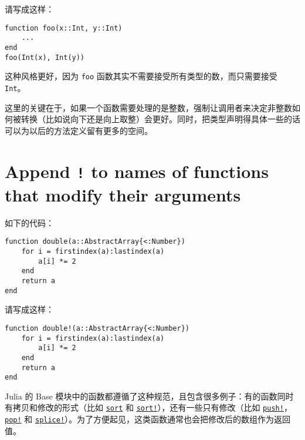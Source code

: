 请写成这样：




\begin{verbatim}
function foo(x::Int, y::Int)
    ...
end
foo(Int(x), Int(y))
\end{verbatim}



这种风格更好，因为 \texttt{foo} 函数其实不需要接受所有类型的数，而只需要接受 \texttt{Int}。



这里的关键在于，如果一个函数需要处理的是整数，强制让调用者来决定非整数如何被转换（比如说向下还是向上取整）会更好。同时，把类型声明得具体一些的话可以为以后的方法定义留有更多的空间。



\hypertarget{1684346418186777370}{}


\section{Append \texttt{!} to names of functions that modify their arguments}



如下的代码：




\begin{verbatim}
function double(a::AbstractArray{<:Number})
    for i = firstindex(a):lastindex(a)
        a[i] *= 2
    end
    return a
end
\end{verbatim}



请写成这样：




\begin{verbatim}
function double!(a::AbstractArray{<:Number})
    for i = firstindex(a):lastindex(a)
        a[i] *= 2
    end
    return a
end
\end{verbatim}



Julia 的 Base 模块中的函数都遵循了这种规范，且包含很多例子：有的函数同时有拷贝和修改的形式（比如 \hyperlink{8473525809131227606}{\texttt{sort}} 和 \hyperlink{12296873681374954808}{\texttt{sort!}}），还有一些只有修改（比如 \hyperlink{18026893834387542681}{\texttt{push!}}，\hyperlink{14467641005327674015}{\texttt{pop!}} 和 \hyperlink{13785507599688955371}{\texttt{splice!}}）。为了方便起见，这类函数通常也会把修改后的数组作为返回值。



\hypertarget{14194687290331521644}{}


